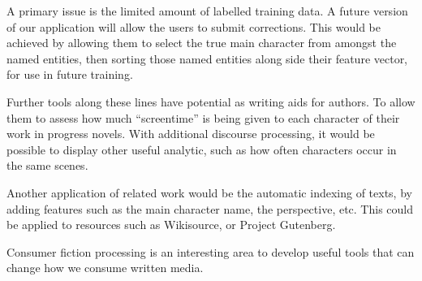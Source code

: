 \documentclass[11pt,a4paper]{article}
\begin{document}
A primary issue is the limited amount of labelled training data.
A future version of our application will allow the users to submit corrections.
This would be achieved by allowing them to select the true main character from amongst the named entities,
then sorting those named entities along side their feature vector,
for use in future training.


Further tools along these lines have potential as writing aids for authors.
To allow them to assess how much ``screentime'' is being given to each character of their work in progress novels.
With additional discourse processing, it would be possible to display other useful analytic, such as how often characters occur in the same scenes.

Another application of related work would be the automatic indexing of texts,
 by adding features such as the main character name, the perspective, etc.
This could be applied to resources such as Wikisource, or Project Gutenberg.

Consumer fiction processing is an interesting area to develop useful tools that can change how we consume written media.


\end{document}
